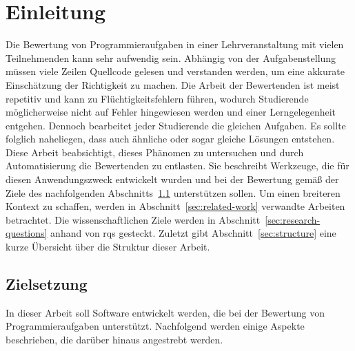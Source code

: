 \chapter{Einleitung}\label{ch:introduction}

Die Bewertung von Programmieraufgaben in einer Lehrveranstaltung mit vielen Teilnehmenden kann sehr aufwendig sein.
Abhängig von der Aufgabenstellung müssen viele Zeilen Quellcode gelesen und verstanden werden, um eine akkurate Einschätzung der Richtigkeit zu machen.
Die Arbeit der Bewertenden ist meist repetitiv und kann zu Flüchtigkeitsfehlern führen, wodurch Studierende möglicherweise nicht auf Fehler hingewiesen werden und einer Lerngelegenheit entgehen.
Dennoch bearbeitet jeder Studierende die gleichen Aufgaben.
Es sollte folglich naheliegen, dass auch ähnliche oder sogar gleiche Lösungen entstehen.
Diese Arbeit beabsichtigt, dieses Phänomen zu untersuchen und durch Automatisierung die Bewertenden zu entlasten.
Sie beschreibt Werkzeuge, die für diesen Anwendungszweck entwickelt wurden und bei der Bewertung gemäß der Ziele des nachfolgenden Abschnitts~\ref{sec:goals} unterstützen sollen.
Um einen breiteren Kontext zu schaffen, werden in Abschnitt~\ref{sec:related-work} verwandte Arbeiten betrachtet.
Die wissenschaftlichen Ziele werden in Abschnitt~\ref{sec:research-questions} anhand von \acp{rq} gesteckt.
Zuletzt gibt Abschnitt~\ref{sec:structure} eine kurze Übersicht über die Struktur dieser Arbeit.

\section{Zielsetzung}\label{sec:goals}

In dieser Arbeit soll Software entwickelt werden, die bei der Bewertung von Programmieraufgaben unterstützt.
Nachfolgend werden einige Aspekte beschrieben, die darüber hinaus angestrebt werden.

